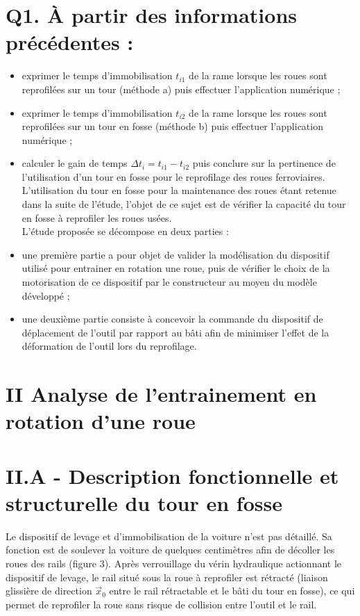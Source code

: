 \documentclass[10pt]{article}
\begin{document}
\section*{Q1. À partir des informations précédentes :}
\begin{itemize}
  \item exprimer le temps d'immobilisation $t_{i 1}$ de la rame lorsque les roues sont reprofilées sur un tour (méthode a) puis effectuer l'application numérique ;
  \item exprimer le temps d'immobilisation $t_{i 2}$ de la rame lorsque les roues sont reprofilées sur un tour en fosse (méthode b) puis effectuer l'application numérique ;
  \item calculer le gain de temps $\Delta t_{i}=t_{i 1}-t_{i 2}$ puis conclure sur la pertinence de l'utilisation d'un tour en fosse pour le reprofilage des roues ferroviaires.\\
L'utilisation du tour en fosse pour la maintenance des roues étant retenue dans la suite de l'étude, l'objet de ce sujet est de vérifier la capacité du tour en fosse à reprofiler les roues usées.\\
L'étude proposée se décompose en deux parties :
  \item une première partie a pour objet de valider la modélisation du dispositif utilisé pour entrainer en rotation une roue, puis de vérifier le choix de la motorisation de ce dispositif par le constructeur au moyen du modèle développé ;
  \item une deuxième partie consiste à concevoir la commande du dispositif de déplacement de l'outil par rapport au bâti afin de minimiser l'effet de la déformation de l'outil lors du reprofilage.
\end{itemize}

\section*{II Analyse de l'entrainement en rotation d'une roue}
\section*{II.A - Description fonctionnelle et structurelle du tour en fosse}
Le dispositif de levage et d'immobilisation de la voiture n'est pas détaillé. Sa fonction est de soulever la voiture de quelques centimètres afin de décoller les roues des rails (figure 3). Après verrouillage du vérin hydraulique actionnant le dispositif de levage, le rail situé sous la roue à reprofiler est rétracté (liaison glissière de direction $\vec{x}_{0}$ entre le rail rétractable et le bâti du tour en fosse), ce qui permet de reprofiler la roue sans risque de collision entre l'outil et le rail.
\end{document}
